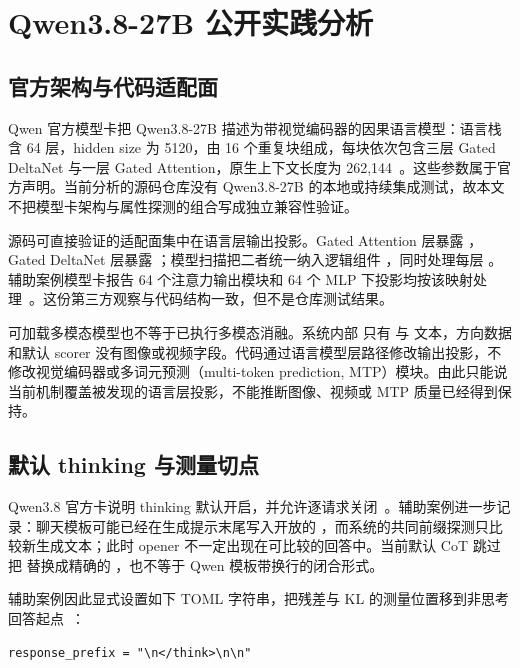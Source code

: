 \section{Qwen3.8-27B 公开实践分析}

\subsection{官方架构与代码适配面}

Qwen 官方模型卡把 Qwen3.8-27B 描述为带视觉编码器的因果语言模型：语言栈含 64 层，hidden size 为 5120，由 16 个重复块组成，每块依次包含三层 Gated DeltaNet 与一层 Gated Attention，原生上下文长度为 262,144~\cite{qwen38official}。这些参数属于官方声明。当前分析的源码仓库没有 Qwen3.8-27B 的本地或持续集成测试，故本文不把模型卡架构与属性探测的组合写成独立兼容性验证。

源码可直接验证的适配面集中在语言层输出投影。Gated Attention 层暴露 ，Gated DeltaNet 层暴露 ；模型扫描把二者统一纳入逻辑组件 ，同时处理每层 。辅助案例模型卡报告 64 个注意力输出模块和 64 个 MLP 下投影均按该映射处理~\cite{qwen38auxcase}。这份第三方观察与代码结构一致，但不是仓库测试结果。

可加载多模态模型也不等于已执行多模态消融。系统内部  只有  与  文本，方向数据和默认 scorer 没有图像或视频字段。代码通过语言模型层路径修改输出投影，不修改视觉编码器或多词元预测（multi-token prediction, MTP）模块。由此只能说当前机制覆盖被发现的语言层投影，不能推断图像、视频或 MTP 质量已经得到保持。

\subsection{默认 thinking 与测量切点}

Qwen3.8 官方卡说明 thinking 默认开启，并允许逐请求关闭~\cite{qwen38official}。辅助案例进一步记录：聊天模板可能已经在生成提示末尾写入开放的 ，而系统的共同前缀探测只比较新生成文本；此时 opener 不一定出现在可比较的回答中。当前默认 CoT 跳过把  替换成精确的 ，也不等于 Qwen 模板带换行的闭合形式。

辅助案例因此显式设置如下 TOML 字符串，把残差与 KL 的测量位置移到非思考回答起点~\cite{qwen38auxcase}：

\begin{verbatim}
response_prefix = "\n</think>\n\n"
\end{verbatim}

